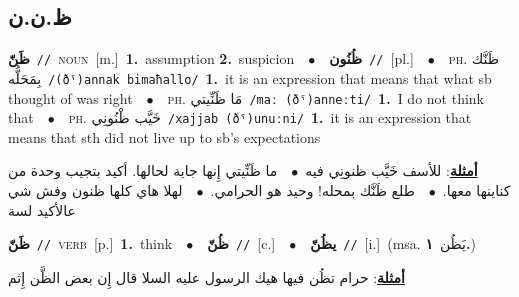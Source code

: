 \documentclass[10pt,a4paper,twoside]{article} %
\begin{document}
\begin{multicols}{2}
\vspace{-3mm}
\subsection*{\color{blue}\foreignlanguage{arabic}{ظ.ن.ن}\color{blue}{}} 

{\setlength\topsep{0pt}\textbf{\foreignlanguage{arabic}{ظَنّ}}\ {\color{gray}\texttt{//}\color{black}}\ \textsc{noun}\ [m.]\ \textbf{1.}~assumption  \textbf{2.}~suspicion\ \ $\bullet$\ \ \setlength\topsep{0pt}\textbf{\foreignlanguage{arabic}{ظُنُون}}\ {\color{gray}\texttt{//}\color{black}}\ [pl.]\ \ $\bullet$\ \ \textsc{ph.} \color{gray} \foreignlanguage{arabic}{ظَنَّك بِمَحَلُّه}\color{black}\ {\color{gray}\texttt{/{\sffamily (ðˤ)annak bimaħallo}/}\color{black}}\ \textbf{1.}~it is an expression that means that what sb thought of was right\ \ $\bullet$\ \ \textsc{ph.} \color{gray} \foreignlanguage{arabic}{مَا ظَنِّيتي}\color{black}\ {\color{gray}\texttt{/{\sffamily maː (ðˤ)anneːti}/}\color{black}}\ \textbf{1.}~I do not think that\ \ $\bullet$\ \ \textsc{ph.} \color{gray} \foreignlanguage{arabic}{خَيَّب ظْنُونِي}\color{black}\ {\color{gray}\texttt{/{\sffamily xajjab (ðˤ)unuːni}/}\color{black}}\ \textbf{1.}~it is an expression that means that sth did not live up to sb's expectations\  \begin{flushright}\color{gray}\foreignlanguage{arabic}{\textbf{\underline{\foreignlanguage{arabic}{أمثلة}}}: للأسف خَيَّب ظنونِي فيه\ $\bullet$\ \  ما ظَنِّيتي إِنها جاية لحالها. أكيد بتجيب وحدة من كناينها معها.\ $\bullet$\ \  طلع ظَنَّك بمحله! وحيد هو الحرامي.\ $\bullet$\ \  لهلا هاي كلها ظنون وفش شي عالأكيد لسة}\end{flushright}\color{black}} \vspace{2mm}

{\setlength\topsep{0pt}\textbf{\foreignlanguage{arabic}{ظَنّ}}\ {\color{gray}\texttt{//}\color{black}}\ \textsc{verb}\ [p.]\ \textbf{1.}~think\ \ $\bullet$\ \ \setlength\topsep{0pt}\textbf{\foreignlanguage{arabic}{ظُنّ}}\ {\color{gray}\texttt{//}\color{black}}\ [c.]\ \ $\bullet$\ \ \setlength\topsep{0pt}\textbf{\foreignlanguage{arabic}{يظُنّ}}\ {\color{gray}\texttt{//}\color{black}}\ [i.]\ \color{gray}(msa. \foreignlanguage{arabic}{يَظُن}~\foreignlanguage{arabic}{\textbf{١.}})\color{black}\  \begin{flushright}\color{gray}\foreignlanguage{arabic}{\textbf{\underline{\foreignlanguage{arabic}{أمثلة}}}: حرام تظُن فيها هيك الرسول عليه السلا قال إِن بعض الظَّن إِثم}\end{flushright}\color{black}} \vspace{2mm}


\end{multicols}
\end{document}
